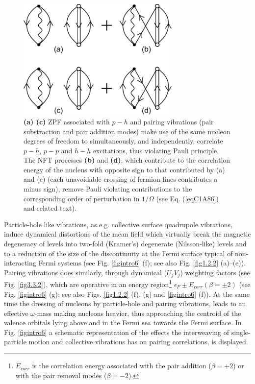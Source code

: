 \begin{figure}
\centerline {
\includegraphics*[width=8cm]{introduccion/figs/figintroF2}
}
\caption[Interaction between $\beta=0$ and $\beta=\pm2$ ZPF.]{ \textbf{(a) (c)}  ZPF associated with $p-h$ and pairing vibrations (pair substraction and pair addition modes) make use of the same nucleon degrees of freedom to simultaneously, and independently, correlate  $p-h$, $p-p$ and $h-h$ excitations, thus violating Pauli principle. The NFT processes \textbf{(b)} and \textbf{(d)}, which contribute to the correlation energy of the nucleus with opposite sign to that contributed by (a) and (c) (each unavoidable crossing of fermion lines contributes  a minus sign), remove Pauli violating contributions to the corresponding order of perturbation in $1/\Omega$ (see Eq. (\ref{eqC1A86}) and related text).}
\label{figintroF2}
\end{figure}
Particle-hole like vibrations, as e.g. collective surface quadrupole vibrations, induce dynamical distortions of the mean field which virtually break the  magnetic degeneracy of levels into two-fold (Kramer's) degenerate (Nilsson-like) levels and to a reduction of the size of the discontinuity at the Fermi surface typical of non-interacting Fermi systems (see Fig. \ref{figintro6} (f); see also Fig. \ref{fig1.2.2} (a)--(e)). Pairing vibrations does similarly, through dynamical ($U_jV_j$) weighting factors (see Fig. \ref{fig3.3.2}), which are operative in an energy region\footnote{$E_{corr}$ is the correlation energy associated with the pair addition ($\beta=+2$) or with the pair removal modes ($\beta=-2$).}  $\epsilon_F\pm E_{corr}(\beta=\pm2)$ (see Fig. \ref{figintro6} (g); see also Figs. \ref{fig1.2.2} (f), (g) and \ref{figintro6} (f)). At the same time the dressing of nucleons by particle-hole and pairing vibrations, leads to an effective $\omega$-mass making nucleons heavier, thus approaching the centroid of the valence orbitals lying above and in the Fermi sea towards the Fermi surface.  In Fig. \ref{figintro6} a schematic representation of the  effects the interweaving of single-particle motion and collective vibrations has on pairing correlations, is displayed. 





